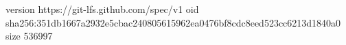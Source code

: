 version https://git-lfs.github.com/spec/v1
oid sha256:351db1667a2932e5cbac240805615962ea0476bf8cdc8eed523cc6213d1840a0
size 536997
